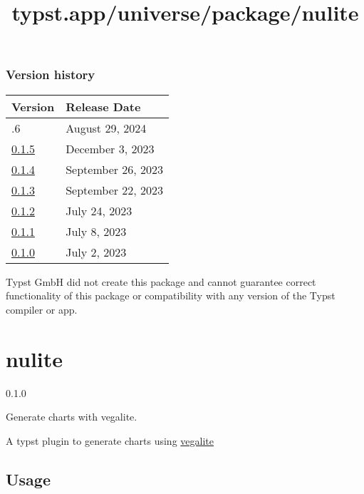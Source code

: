\label{versions}
\subsubsection{Version history}\label{version-history}

\begin{longtable}[]{@{}ll@{}}
\toprule\noalign{}
Version & Release Date \\
\midrule\noalign{}
\endhead
\bottomrule\noalign{}
\endlastfoot
0.1.6 & August 29, 2024 \\
\href{https://typst.app/universe/package/lemmify/0.1.5/}{0.1.5} &
December 3, 2023 \\
\href{https://typst.app/universe/package/lemmify/0.1.4/}{0.1.4} &
September 26, 2023 \\
\href{https://typst.app/universe/package/lemmify/0.1.3/}{0.1.3} &
September 22, 2023 \\
\href{https://typst.app/universe/package/lemmify/0.1.2/}{0.1.2} & July
24, 2023 \\
\href{https://typst.app/universe/package/lemmify/0.1.1/}{0.1.1} & July
8, 2023 \\
\href{https://typst.app/universe/package/lemmify/0.1.0/}{0.1.0} & July
2, 2023 \\
\end{longtable}

Typst GmbH did not create this package and cannot guarantee correct
functionality of this package or compatibility with any version of the
Typst compiler or app.


\title{typst.app/universe/package/nulite}

\label{banner}
\section{nulite}\label{nulite}

{ 0.1.0 }

Generate charts with vegalite.

\label{readme}
A typst plugin to generate charts using
\href{https://vega.github.io/vega-lite/}{vegalite}

\subsection{Usage}\label{usage}

\begin{Shaded}
\begin{Highlighting}[]

\NormalTok{  )}
\end{Highlighting}
\end{Shaded}

